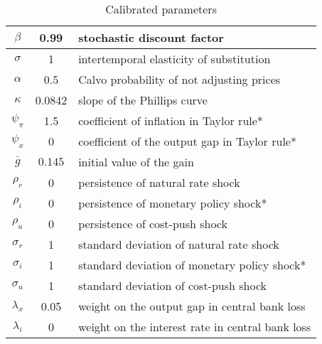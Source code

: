 \documentclass[11pt]{article}
\renewcommand{\[}{\begin{equation}}
\renewcommand{\]}{\end{equation}}
\begin{document}
\begin{center}
\begin{table}
\begin{tabular}{ c | c  | l }
 $\beta$ & 0.99 & stochastic discount factor \\  \hline
 $\sigma$ & 1  & intertemporal elasticity of substitution \\  \hline
 $\alpha$ & 0.5 &  Calvo probability of not adjusting prices \\\hline
 $\kappa$ & 0.0842 &  slope of the Phillips curve \\\hline
 $\psi_{\pi} $& 1.5  & coefficient of inflation in Taylor rule*\\\hline
 $\psi_x$ & 0   & coefficient of the output gap in Taylor rule*  \\\hline %
 $\bar{g}$ & $0.145$  & initial value of the gain \\\hline %
    $\rho_r$ & 0 &   persistence of natural rate shock \\ \hline %
    $\rho_i$ & 0 &  persistence of monetary policy shock*  \\ \hline
    $\rho_u$ & 0  &  persistence of cost-push shock  \\ \hline
    $\sigma_r$ & 1 & standard deviation of natural rate shock  \\ \hline
    $\sigma_i$ &  1  &standard deviation of monetary policy shock*  \\ \hline %
    $\sigma_u$ & 1 & standard deviation of cost-push shock   \\ \hline  
    $\lambda_x$ & 0.05 & weight on the output gap in central bank loss   \\ \hline  %
    $\lambda_i$ & 0 & weight on the interest rate in central bank loss   \\ \hline  
\end{tabular}     
      \caption{Calibrated parameters}  \label{calibration1}
 \end{table}
\end{center}
\end{document}
